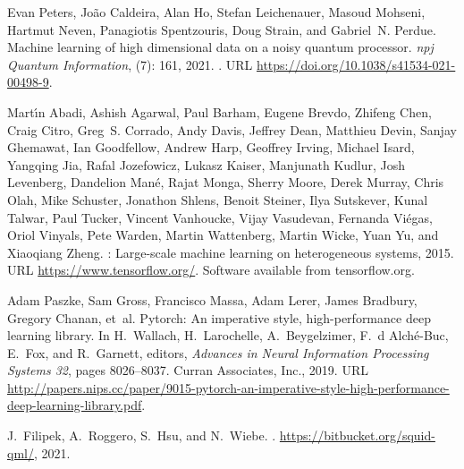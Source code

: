 \documentclass[letterpaper,preprintnumbers,preprint,aps,accepted=2022-05-26]{quantumarticle}
\begin{document}
\begin{thebibliography}{39}
Evan Peters, João Caldeira, Alan Ho, Stefan Leichenauer, Masoud Mohseni,
  Hartmut Neven, Panagiotis Spentzouris, Doug Strain, and Gabriel~N. Perdue.
\newblock Machine learning of high dimensional data on a noisy quantum
  processor.
\newblock \emph{npj Quantum Information},  (7): 161, 2021.
\newblock {}.
\newblock URL \url{https://doi.org/10.1038/s41534-021-00498-9}.

Mart\'{\i}n Abadi, Ashish Agarwal, Paul Barham, Eugene Brevdo, Zhifeng Chen,
  Craig Citro, Greg~S. Corrado, Andy Davis, Jeffrey Dean, Matthieu Devin,
  Sanjay Ghemawat, Ian Goodfellow, Andrew Harp, Geoffrey Irving, Michael Isard,
  Yangqing Jia, Rafal Jozefowicz, Lukasz Kaiser, Manjunath Kudlur, Josh
  Levenberg, Dandelion Man\'{e}, Rajat Monga, Sherry Moore, Derek Murray, Chris
  Olah, Mike Schuster, Jonathon Shlens, Benoit Steiner, Ilya Sutskever, Kunal
  Talwar, Paul Tucker, Vincent Vanhoucke, Vijay Vasudevan, Fernanda Vi\'{e}gas,
  Oriol Vinyals, Pete Warden, Martin Wattenberg, Martin Wicke, Yuan Yu, and
  Xiaoqiang Zheng.
: Large-scale machine learning on heterogeneous systems,
  2015.
\newblock URL \url{https://www.tensorflow.org/}.
\newblock Software available from tensorflow.org.

Adam Paszke, Sam Gross, Francisco Massa, Adam Lerer, James Bradbury, Gregory
  Chanan, et~al.
\newblock Pytorch: An imperative style, high-performance deep learning library.
\newblock In H.~Wallach, H.~Larochelle, A.~Beygelzimer, F.~d\textquotesingle
  Alch\'{e}-Buc, E.~Fox, and R.~Garnett, editors, \emph{Advances in Neural
  Information Processing Systems 32}, pages 8026--8037. Curran Associates,
  Inc., 2019.
\newblock URL
  \url{http://papers.nips.cc/paper/9015-pytorch-an-imperative-style-high-performance-deep-learning-library.pdf}.

J.~Filipek, A.~Roggero, S.~Hsu, and N.~Wiebe.
.
\newblock \url{https://bitbucket.org/squid-qml/}, 2021.


\end{thebibliography}
\end{document}
